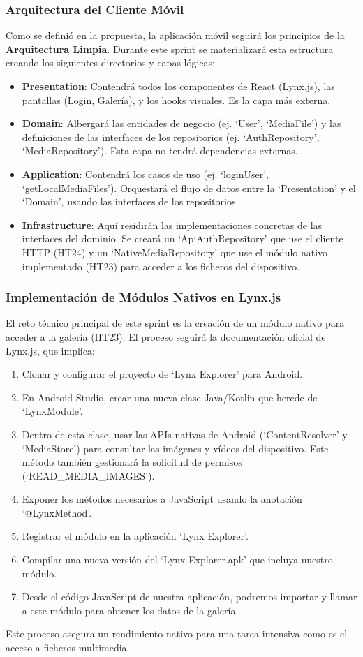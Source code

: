 \subsubsection{Arquitectura del Cliente Móvil}
Como se definió en la propuesta, la aplicación móvil seguirá los principios de la \textbf{Arquitectura Limpia}. Durante este sprint se materializará esta estructura creando los siguientes directorios y capas lógicas:
\begin{itemize}
    \item \textbf{Presentation}: Contendrá todos los componentes de React (Lynx.js), las pantallas (Login, Galería), y los hooks visuales. Es la capa más externa.
    \item \textbf{Domain}: Albergará las entidades de negocio (ej. `User', `MediaFile') y las definiciones de las interfaces de los repositorios (ej. `AuthRepository', `MediaRepository'). Esta capa no tendrá dependencias externas.
    \item \textbf{Application}: Contendrá los casos de uso (ej. `loginUser', `getLocalMediaFiles'). Orquestará el flujo de datos entre la `Presentation' y el `Domain', usando las interfaces de los repositorios.
    \item \textbf{Infrastructure}: Aquí residirán las implementaciones concretas de las interfaces del dominio. Se creará un `ApiAuthRepository' que use el cliente HTTP (HT24) y un `NativeMediaRepository' que use el módulo nativo implementado (HT23) para acceder a los ficheros del dispositivo.
\end{itemize}

\subsubsection{Implementación de Módulos Nativos en Lynx.js}
El reto técnico principal de este sprint es la creación de un módulo nativo para acceder a la galería (HT23). El proceso seguirá la documentación oficial de Lynx.js, que implica:
\begin{enumerate}
    \item Clonar y configurar el proyecto de `Lynx Explorer' para Android.
    \item En Android Studio, crear una nueva clase Java/Kotlin que herede de `LynxModule'.
    \item Dentro de esta clase, usar las APIs nativas de Android (`ContentResolver' y `MediaStore') para consultar las imágenes y vídeos del dispositivo. Este método también gestionará la solicitud de permisos (`READ\_MEDIA\_IMAGES').
    \item Exponer los métodos necesarios a JavaScript usando la anotación `@LynxMethod'.
    \item Registrar el módulo en la aplicación `Lynx Explorer'.
    \item Compilar una nueva versión del `Lynx Explorer.apk' que incluya nuestro módulo.
    \item Desde el código JavaScript de nuestra aplicación, podremos importar y llamar a este módulo para obtener los datos de la galería.
\end{enumerate}
Este proceso asegura un rendimiento nativo para una tarea intensiva como es el acceso a ficheros multimedia.


